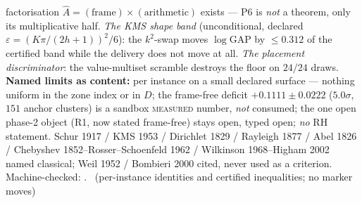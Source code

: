 factorisation $\hat A=(\mathrm{frame})\times(\mathrm{arithmetic})$
exists --- P6 is \emph{not} a theorem, only its multiplicative half.
\emph{The KMS shape band} (unconditional, declared
$\varepsilon=(K\pi/(2h+1))^2/6$): the $k^2$-swap moves
$\log\mathrm{GAP}$ by $\le0.312$ of the certified band while the
delivery does not move at all. \emph{The placement discriminator}: the
value-multiset scramble destroys the floor on $24/24$ draws.
\textbf{Named limits as content:} per instance on a small declared
surface --- nothing uniform in the zone index or in $D$; the
frame-free deficit $+0.1111\pm0.0222$ ($5.0\sigma$, $151$ anchor
clusters) is a sandbox \textsc{measured} number, \emph{not} consumed;
the one open phase-2 object (R1, now stated frame-free) stays open,
typed open; \emph{no} RH statement.
Schur 1917 / KMS 1953 / Dirichlet 1829 / Rayleigh 1877 / Abel 1826 /
Chebyshev 1852--Rosser--Schoenfeld 1962 / Wilkinson 1968--Higham 2002
named classical; Weil 1952 / Bombieri 2000 cited, never used as a
criterion.
Machine-checked:
.
\mE\ (per-instance identities and certified inequalities; no marker moves)


